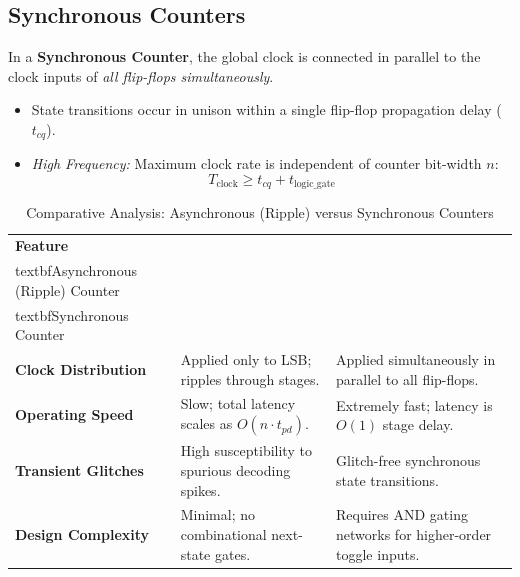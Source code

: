 \subsection{Synchronous Counters}
In a \textbf{Synchronous Counter}, the global clock is connected in parallel to the clock inputs of \textit{all flip-flops simultaneously}.
\begin{itemize}
    \item State transitions occur in unison within a single flip-flop propagation delay ($t_{cq}$).
    \item \textit{High Frequency:} Maximum clock rate is independent of counter bit-width $n$:
    \[ T_{\text{clock}} \ge t_{cq} + t_{\text{logic\_gate}} \]
\end{itemize}

\begin{table}[htbp]
\centering
\small
\caption{Comparative Analysis: Asynchronous (Ripple) versus Synchronous Counters}
\label{tab:async_vs_sync_counters}
\begin{tabularx}{\textwidth}{l X X}
\toprule
\textbf{Feature} & \\textbf{Asynchronous (Ripple) Counter} & \\textbf{Synchronous Counter} \\
\midrule
\textbf{Clock Distribution} & Applied only to LSB; ripples through stages. & Applied simultaneously in parallel to all flip-flops. \\
\textbf{Operating Speed} & Slow; total latency scales as $O(n \cdot t_{pd})$. & Extremely fast; latency is $O(1)$ stage delay. \\
\textbf{Transient Glitches} & High susceptibility to spurious decoding spikes. & Glitch-free synchronous state transitions. \\
\textbf{Design Complexity} & Minimal; no combinational next-state gates. & Requires AND gating networks for higher-order toggle inputs. \\
\bottomrule
\end{tabularx}
\end{table}

